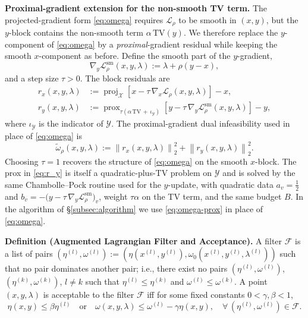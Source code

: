 \documentclass[11pt]{article}
\newcommand{\proj}{\operatorname{proj}}
\newcommand{\TV}{\mathrm{TV}}
\begin{document}
\medskip
\noindent\textbf{Proximal-gradient extension for the non-smooth TV term.}
The projected-gradient form \eqref{eq:omega} requires $\mathcal{L}_\rho$ to be smooth in $(x,y)$, but the $y$-block contains the non-smooth term $\alpha\,\TV(y)$. We therefore replace the $y$-component of \eqref{eq:omega} by a \emph{proximal}-gradient residual while keeping the smooth $x$-component as before. Define the smooth part of the $y$-gradient,
\begin{equation}\label{eq:gradL-smooth}
  \nabla_y \mathcal{L}^{\mathrm{sm}}_\rho(x,y,\lambda) := \lambda + \rho(y - x),
\end{equation}
and a step size $\tau > 0$. The block residuals are
\begin{align}
  r_x(x,y,\lambda) &:= \proj_{\mathcal{X}}\!\left[x - \tau\,\nabla_x \mathcal{L}_\rho(x,y,\lambda)\right] - x, \label{eq:r_x}\\[4pt]
  r_y(x,y,\lambda) &:= \operatorname{prox}_{\tau\left(\alpha\,\TV \,+\, \iota_{\mathcal{Y}}\right)}\!\left[y - \tau\,\nabla_y \mathcal{L}^{\mathrm{sm}}_\rho(x,y,\lambda)\right] - y, \label{eq:r_y}
\end{align}
where $\iota_{\mathcal{Y}}$ is the indicator of $\mathcal{Y}$. The proximal-gradient dual infeasibility used in place of \eqref{eq:omega} is
\begin{equation}\label{eq:omega-prox}
  \widetilde{\omega}_\rho(x,y,\lambda) := \left\|r_x(x,y,\lambda)\right\|_2^2 + \left\|r_y(x,y,\lambda)\right\|_2^2.
\end{equation}
Choosing $\tau = 1$ recovers the structure of \eqref{eq:omega} on the smooth $x$-block. The prox in \eqref{eq:r_y} is itself a quadratic-plus-TV problem on $\mathcal{Y}$ and is solved by the same Chambolle--Pock routine used for the $y$-update, with quadratic data $a_v = \tfrac{1}{2}$ and $b_v = -\bigl(y - \tau\,\nabla_y \mathcal{L}^{\mathrm{sm}}_\rho\bigr)_v$, weight $\tau\alpha$ on the TV term, and the same budget $B$. In the algorithm of \S\ref{subsec:algorithm} we use \eqref{eq:omega-prox} in place of \eqref{eq:omega}.

\medskip
\noindent\textbf{Definition (Augmented Lagrangian Filter and Acceptance).}
A filter $\mathcal{F}$ is a list of pairs
$(\eta^{(l)}, \omega^{(l)}) := (\eta(x^{(l)},y^{(l)}), \omega_0(x^{(l)},y^{(l)},\lambda^{(l)}))$
such that no pair dominates another pair; i.e., there exist no pairs $(\eta^{(l)}, \omega^{(l)})$,
$(\eta^{(k)},\omega^{(k)})$, $l \neq k$ such that $\eta^{(l)} \leq \eta^{(k)}$
and $\omega^{(l)} \leq \omega^{(k)}$.
A point $(x,y,\lambda)$ is acceptable to the filter $\mathcal{F}$ iff for some fixed constants $0 < \gamma, \beta < 1$,
\begin{equation}
  \eta(x,y) \leq \beta\eta^{(l)} \quad \text{or} \quad
  \omega(x,y,\lambda) \leq \omega^{(l)} - \gamma\eta(x,y), \quad
  \forall\, (\eta^{(l)}, \omega^{(l)}) \in \mathcal{F}.
  \label{eq:filter}
\end{equation}
\end{document}
